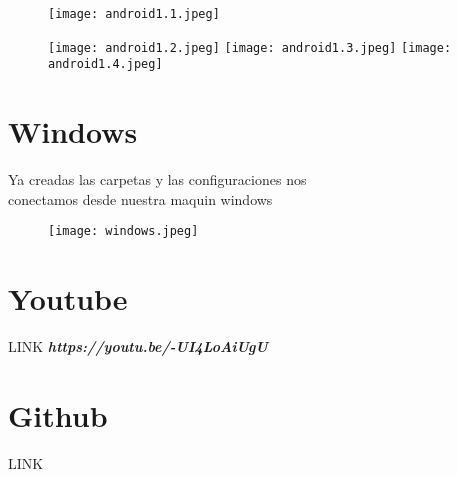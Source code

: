 \documentclass{article}
\begin{document}
\begin{figure}[htp]
\centering
\texttt{[image: android1.1.jpeg]}
\end{figure}

\begin{figure}[htp]
\centering
\texttt{[image: android1.2.jpeg]}
\texttt{[image: android1.3.jpeg]}
\texttt{[image: android1.4.jpeg]}
\end{figure}
\newpage

\section{Windows}
\begin{description}
    \item  [Ya creadas las carpetas y las configuraciones nos ]
    \item [conectamos desde nuestra maquin windows]
\end{description}

\begin{figure}[htp]
\centering
\texttt{[image: windows.jpeg]}
\end{figure}

\section{Youtube}
LINK \textbf{\textit{https://youtu.be/-UI4LoAiUgU}}


\section{Github}
LINK \textbf{\textit{}}
\end{document}

